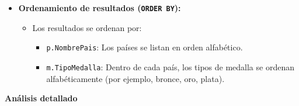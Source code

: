 \begin{itemize}
   \item \textbf{Ordenamiento de resultados (\texttt{ORDER BY}):}
   \begin{itemize}
       \item Los resultados se ordenan por:
       \begin{itemize}
           \item \texttt{p.NombrePais}: Los países se listan en orden alfabético.
           \item \texttt{m.TipoMedalla}: Dentro de cada país, los tipos de medalla se ordenan alfabéticamente (por ejemplo, bronce, oro, plata).
       \end{itemize}
   \end{itemize}
\end{itemize}

\textbf{Análisis detallado}


